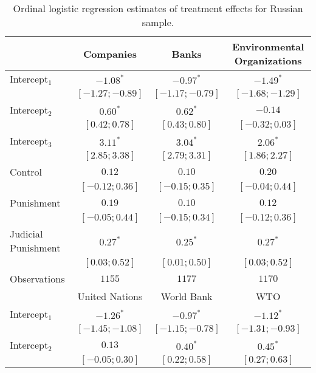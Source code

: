 \begin{table}[h]
\begin{center}
\caption{Ordinal logistic regression estimates of treatment effects for Russian sample.}
\begin{threeparttable}
\begin{tabular}{l c c c}
\hline
 & Companies & Banks & Environmental
Organizations \\
\hline
Intercept$_1$       & $-1.08^{*}$       & $-0.97^{*}$       & $-1.49^{*}$       \\
                    & $ [-1.27; -0.89]$ & $ [-1.17; -0.79]$ & $ [-1.68; -1.29]$ \\
Intercept$_2$       & $0.60^{*}$        & $0.62^{*}$        & $-0.14$           \\
                    & $ [ 0.42;  0.78]$ & $ [ 0.43;  0.80]$ & $ [-0.32;  0.03]$ \\
Intercept$_3$       & $3.11^{*}$        & $3.04^{*}$        & $2.06^{*}$        \\
                    & $ [ 2.85;  3.38]$ & $ [ 2.79;  3.31]$ & $ [ 1.86;  2.27]$ \\
Control             & $0.12$            & $0.10$            & $0.20$            \\
                    & $ [-0.12;  0.36]$ & $ [-0.15;  0.35]$ & $ [-0.04;  0.44]$ \\
Punishment          & $0.19$            & $0.10$            & $0.12$            \\
                    & $ [-0.05;  0.44]$ & $ [-0.15;  0.34]$ & $ [-0.12;  0.36]$ \\
Judicial Punishment & $0.27^{*}$        & $0.25^{*}$        & $0.27^{*}$        \\
                    & $ [ 0.03;  0.52]$ & $ [ 0.01;  0.50]$ & $ [ 0.03;  0.52]$ \\
\hline
Observations        & $1155$            & $1177$            & $1170$            \\
\hline
 & United Nations & World Bank & WTO \\
\hline
Intercept$_1$       & $-1.26^{*}$       & $-0.97^{*}$       & $-1.12^{*}$       \\
                    & $ [-1.45; -1.08]$ & $ [-1.15; -0.78]$ & $ [-1.31; -0.93]$ \\
Intercept$_2$       & $0.13$            & $0.40^{*}$        & $0.45^{*}$        \\
                    & $ [-0.05;  0.30]$ & $ [ 0.22;  0.58]$ & $ [ 0.27;  0.63]$ \\

\end{tabular}
\end{threeparttable}
\end{center}
\end{table}
